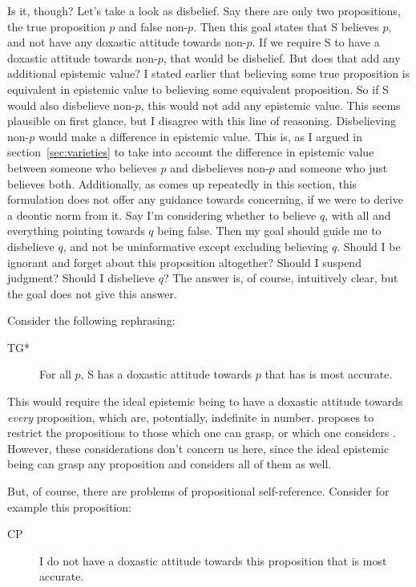 \documentclass[12pt,numbers=noenddot]{scrartcl}
\begin{document}
Is it, though? Let's take a look as disbelief. Say there are only two propositions, the true proposition $p$ and false non-$p$. Then this goal states that S believes $p$, and not have any doxastic attitude towards non-$p$. If we require S to have a doxastic attitude towards non-$p$, that would be disbelief. But does that add any additional epistemic value? I stated earlier that believing some true proposition is equivalent in epistemic value to believing some equivalent proposition. So if S would also disbelieve non-$p$, this would not add any epistemic value. This seems plausible on first glance, but I disagree with this line of reasoning. Disbelieving non-$p$ would make a difference in epistemic value. This is, as I argued in section \ref{sec:varieties} to take into account the difference in epistemic value between someone who believes $p$ and disbelieves non-$p$ and someone who just believes both. Additionally, as comes up repeatedly in this section, this formulation does not offer any guidance towards concerning, if we were to derive a deontic norm from it. Say I'm considering whether to believe $q$, with all and everything pointing towards $q$ being false. Then my goal should guide me to disbelieve $q$, and not be uninformative except excluding believing $q$. Should I be ignorant and forget about this proposition altogether? Should I suspend judgment? Should I disbelieve $q$? The answer is, of course, intuitively clear, but the goal does not give this answer. 

Consider the following rephrasing:

\begin{description}
    \item[TG*] For all $p$, S has a doxastic attitude towards $p$ that has is most accurate.
\end{description}

This would require the ideal epistemic being to have a doxastic attitude towards \emph{every} proposition, which are, potentially, indefinite in number. \textcite[159]{David2001-DAVTAT-7} proposes to restrict the propositions to those which one can grasp, or which one considers \autocite[17]{Chisholm1966-CHITOK}. However, these considerations don't concern us here, since the ideal epistemic being can grasp any proposition and considers all of them as well.

But, of course, there are problems of propositional self-reference. Consider for example this proposition:
\begin{description}
    \item[CP] I do not have a doxastic attitude towards this proposition that is most accurate.
\end{description}
\end{document}
